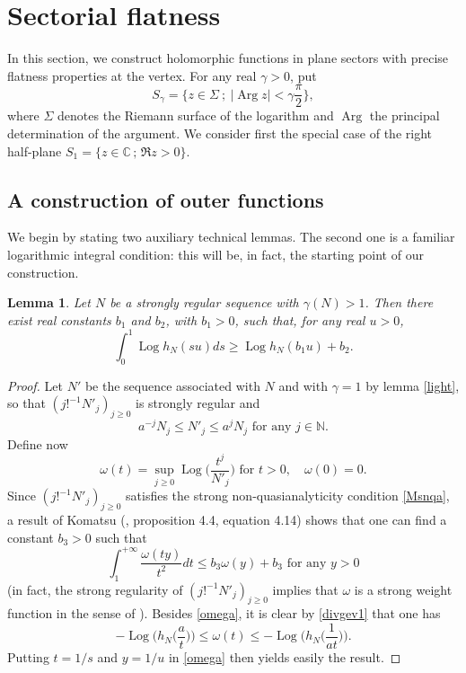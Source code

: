 \documentclass[a4paper]{amsart}
\theoremstyle{plain}
\newtheorem{lem}[subsubsection]{Lemma}
\theoremstyle{definition}
\theoremstyle{remark}
\DeclareMathOperator{\Log}{Log}
\DeclareMathOperator{\Arg}{Arg}
\begin{document}
\section{Sectorial flatness}\label{outer}

In this section, we construct holomorphic functions in plane sectors with precise flatness properties at the vertex. For any real $ \gamma>0 $, put 
\begin{equation*}
S_\gamma
=\Big\{ z\in\Sigma\ ;\ \vert \Arg z\vert<\gamma\frac{\pi}{2}\Big\},
\end{equation*}
where $ \Sigma $ denotes the
Riemann surface of the logarithm and
$ \Arg $ the principal determination of the argument. We consider first the special case
of the right half-plane $ S_1=\{z\in\mathbb{C}\, ;\, \Re z>0\} $.

\subsection{A construction of outer functions}\label{outer1}
We begin by stating two auxiliary technical lemmas. The
second one is a familiar logarithmic integral condition: this will be, in fact, the starting point of our construction.

\begin{lem}\label{weight}
Let $ N $ be a strongly regular sequence with $ \gamma(N)>1 $. Then there exist real constants $ b_1 $ and $ b_2 $, with $ b_1>0 $, such
that, for any real $ u>0 $,
\begin{equation*}
\int_0^1\Log h_N(su)ds\geq \Log h_N(b_1u)+b_2.
\end{equation*}
\end{lem}
\begin{proof} Let $ N' $ be the sequence associated with $ N $ and with $ \gamma=1 $ by lemma \ref{light}, so that $ (j!^{-1}N'_j)_{j\geq 0} $ is strongly regular and
\begin{equation}\label{divgev1}
a^{-j}N_j\leq N'_j\leq a^jN_j \textrm{ for any } j\in \mathbb{N}.
\end{equation}
Define now
\begin{equation*}
\omega(t)=\sup_{j\geq 0}\Log\Big(\frac{t^j}{N'_j}\Big)\text{ for }t>0,\quad\omega(0)=0.
\end{equation*}
Since $ (j!^{-1}N'_j)_{j\geq 0} $ satisfies the strong non-quasianalyticity condition \eqref{Msnqa}, a result
of Komatsu (\cite{Kom}, proposition 4.4, equation 4.14) shows that one can find 
a constant $ b_3>0 $ such that
\begin{equation}\label{omega}
\int_1^{+\infty}\frac{\omega(ty)}{t^2}dt\leq b_3\omega(y)+b_3\text{ for any }y>0
\end{equation}
(in fact, the strong regularity of $ (j!^{-1}N'_j)_{j\geq 0} $ implies that $ \omega $ is a strong weight function in the sense of \cite{BBMT}).
Besides \eqref{omega}, it is clear by \eqref{divgev1} that one has
\begin{equation*}
-\Log\Big(h_N\Big(\frac{a}{t}\Big)\Big)\leq\omega(t)\leq -\Log\Big(h_N\Big(\frac{1}{at}\Big)\Big).
\end{equation*}
Putting $ t=1/s $ and $ y=1/u $ in \eqref{omega} then yields easily the result.
\end{proof}
\end{document}

